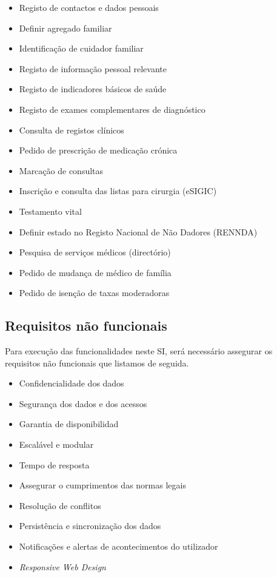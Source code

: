 \documentclass[12pt, a4paper, twoside]{report} %
\begin{document}
\begin{itemize}

\item Registo de contactos e dados pessoais
\item Definir agregado familiar 
\item Identificação de cuidador familiar
\item Registo de informação pessoal relevante
\item Registo de indicadores básicos de saúde
\item Registo de exames complementares de diagnóstico
\item Consulta de registos clínicos
\item Pedido de prescrição de medicação crónica
\item Marcação de consultas
\item Inscrição e consulta das listas para cirurgia (eSIGIC)
\item Testamento vital
\item Definir estado no Registo Nacional de Não Dadores (RENNDA)
\item Pesquisa de serviços médicos (directório)
\item Pedido de mudança de médico de família
\item Pedido de isenção de taxas moderadoras

\end{itemize}

\subsection{Requisitos não funcionais}

Para execução das funcionalidades neste SI, será necessário assegurar os requisitos não funcionais que listamos de seguida.

\begin{itemize}
\item Confidencialidade dos dados
\item Segurança dos dados e dos acessos
\item Garantia de disponibilidad
\item Escalável e modular
\item Tempo de resposta
\item Assegurar o cumprimentos das normas legais
\item Resolução de conflitos
\item Persistência e sincronização dos dados
\item Notificações e alertas de acontecimentos do utilizador
\item \textit {Responsive Web Design}
\end{itemize}
\end{document}
